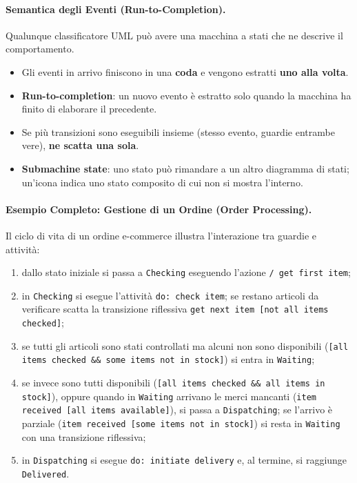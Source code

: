 \documentclass[12pt]{extarticle}
\begin{document}
\paragraph{Semantica degli Eventi (Run-to-Completion).}
Qualunque classificatore UML può avere una macchina a stati che ne descrive il comportamento.
\begin{itemize}
    \item Gli eventi in arrivo finiscono in una \textbf{coda} e vengono estratti \textbf{uno alla volta}.
    \item \textbf{Run-to-completion}: un nuovo evento è estratto solo quando la macchina ha finito di elaborare il precedente.
    \item Se più transizioni sono eseguibili insieme (stesso evento, guardie entrambe vere), \textbf{ne scatta una sola}.
    \item \textbf{Submachine state}: uno stato può rimandare a un altro diagramma di stati; un'icona indica uno stato composito di cui non si mostra l'interno.
\end{itemize}

\paragraph{Esempio Completo: Gestione di un Ordine (Order Processing).}
Il ciclo di vita di un ordine e-commerce illustra l'interazione tra guardie e attività:
\begin{enumerate}
    \item dallo stato iniziale si passa a \texttt{Checking} eseguendo l'azione \texttt{/ get first item};
    \item in \texttt{Checking} si esegue l'attività \texttt{do: check item}; se restano articoli da verificare scatta la transizione riflessiva \texttt{get next item [not all items checked]};
    \item se tutti gli articoli sono stati controllati ma alcuni non sono disponibili (\texttt{[all items checked \&\& some items not in stock]}) si entra in \texttt{Waiting};
    \item se invece sono tutti disponibili (\texttt{[all items checked \&\& all items in stock]}), oppure quando in \texttt{Waiting} arrivano le merci mancanti (\texttt{item received [all items available]}), si passa a \texttt{Dispatching}; se l'arrivo è parziale (\texttt{item received [some items not in stock]}) si resta in \texttt{Waiting} con una transizione riflessiva;
    \item in \texttt{Dispatching} si esegue \texttt{do: initiate delivery} e, al termine, si raggiunge \texttt{Delivered}.
\end{enumerate}
\end{document}
